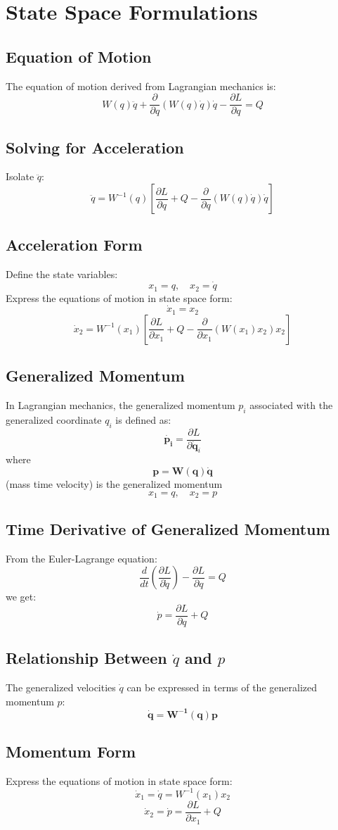 \section{State Space Formulations}

\subsection{Equation of Motion}
The equation of motion derived from Lagrangian mechanics is:
\[
W(q) \ddot{q} + \frac{\partial}{\partial q} (W(q) \dot{q}) \dot{q} - \frac{\partial L}{\partial q} = Q
\]


\subsection{Solving for Acceleration}
Isolate \(\ddot{q}\):
\[
\ddot{q} = W^{-1}(q) \left[ \frac{\partial L}{\partial q} + Q - \frac{\partial}{\partial q} (W(q) \dot{q}) \dot{q} \right]
\]

\subsection{Acceleration Form}
Define the state variables:
\[
x_1 = q, \quad x_2 = \dot{q}
\]
Express the equations of motion in state space form:
\[
\dot{x}_1 = x_2
\]
\[
\dot{x}_2 = W^{-1}(x_1) \left[ \frac{\partial L}{\partial x_1} + Q - \frac{\partial}{\partial x_1} (W(x_1) x_2) x_2 \right]
\]



\subsection{Generalized Momentum}
In Lagrangian mechanics, the generalized momentum \( p_i \) associated with the generalized coordinate \( q_i \) is defined as:
\[
\dot{\mathbf{p_i}} = \frac{\partial L}{\partial \dot{\mathbf{q}}_i} 
\]
where 
\[
\mathbf{p} = \mathbf{W}(\mathbf{q})\dot{\mathbf{q}}
\]
(mass time velocity) is the generalized momentum
\[
x_1 = q, \quad x_2 = p
\]
\subsection{Time Derivative of Generalized Momentum}
From the Euler-Lagrange equation:
\[
\frac{d}{dt} \left( \frac{\partial L}{\partial \dot{q}} \right) - \frac{\partial L}{\partial q} = Q
\]
we get:
\[
\dot{p} = \frac{\partial L}{\partial q} + Q
\]


\subsection{Relationship Between \(\dot{q}\) and \( p \)}
The generalized velocities \(\dot{q}\) can be expressed in terms of the generalized momentum \( p \):
\[
\dot{\mathbf{q}} = \mathbf{W^{-1}(q) p}
\]


\subsection{Momentum Form}
Express the equations of motion in state space form:
\[
\dot{x}_1 = \dot{q} = W^{-1}(x_1) x_2
\]
\[
\dot{x}_2 = \dot{p} = \frac{\partial L}{\partial x_1} + Q 
\]
